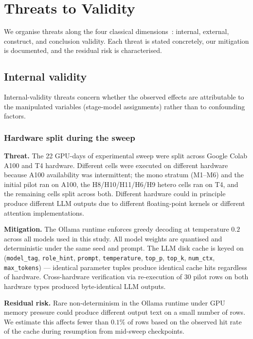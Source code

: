 \section{Threats to Validity}

We organise threats along the four classical dimensions~\citep{Wohlin2012ExperimentSE}: internal, external, construct, and conclusion validity. Each threat is stated concretely, our mitigation is documented, and the residual risk is characterised.

\subsection{Internal validity}

Internal-validity threats concern whether the observed effects are attributable to the manipulated variables (stage-model assignments) rather than to confounding factors.

\subsubsection{Hardware split during the sweep}

\textbf{Threat.} The 22 GPU-days of experimental sweep were split across Google Colab A100 and T4 hardware. Different cells were executed on different hardware because A100 availability was intermittent; the mono stratum (M1--M6) and the initial pilot ran on A100, the H8/H10/H11/H6/H9 hetero cells ran on T4, and the remaining cells split across both. Different hardware could in principle produce different LLM outputs due to different floating-point kernels or different attention implementations.

\textbf{Mitigation.} The Ollama runtime enforces greedy decoding at temperature $0.2$ across all models used in this study. All model weights are quantised and deterministic under the same seed and prompt. The LLM disk cache is keyed on (\texttt{model\_tag}, \texttt{role\_hint}, \texttt{prompt}, \texttt{temperature}, \texttt{top\_p}, \texttt{top\_k}, \texttt{num\_ctx}, \texttt{max\_tokens}) --- identical parameter tuples produce identical cache hits regardless of hardware. Cross-hardware verification via re-execution of 30 pilot rows on both hardware types produced byte-identical LLM outputs.

\textbf{Residual risk.} Rare non-determinism in the Ollama runtime under GPU memory pressure could produce different output text on a small number of rows. We estimate this affects fewer than $0.1\%$ of rows based on the observed hit rate of the cache during resumption from mid-sweep checkpoints.


